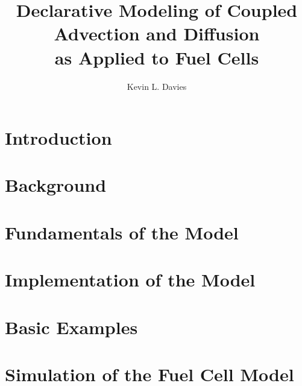 \documentclass[hyperref]{gatech-thesis}
\title{\texorpdfstring%
{Declarative Modeling of Coupled Advection and Diffusion\protect\\as Applied to Fuel Cells}%
{Declarative Modeling of Coupled Advection and Diffusion as Applied to Fuel Cells}}
\author{Kevin L. Davies}
\begin{document}

  \begin{preliminary}
    
    
    
     \contents %
    \begin{summary} %
       
    \end{summary}
  \end{preliminary}


  \chapter{Introduction}
  \label{chap:Introduction}
  

  \chapter{Background}
  \label{chap:Background}
  

  \chapter{Fundamentals of the Model}
  \label{chap:Fundamentals}
  

  \chapter{Implementation of the Model}
  \label{chap:Implementation}
  

  \chapter{Basic Examples}
  \label{chap:Basic}
  

  \chapter{Simulation of the Fuel Cell Model}
  \label{chap:Cell}
  
\end{document}
